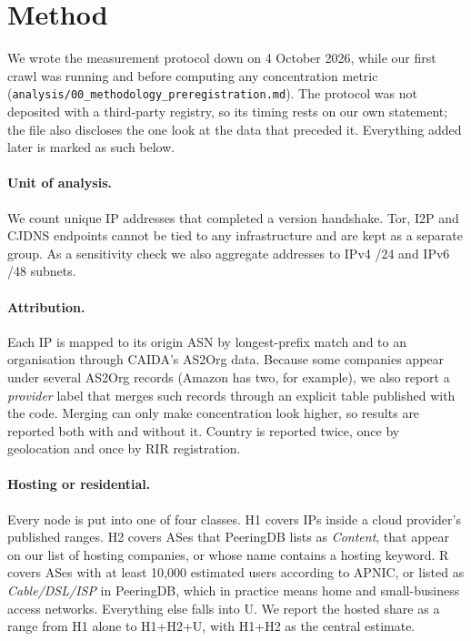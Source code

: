 \documentclass[10pt,a4paper]{article}
\begin{document}
\section{Method}\label{sec:method}

We wrote the measurement protocol down on 4 October 2026, while our first crawl was running and before computing any concentration metric (\texttt{analysis/00\_\allowbreak{}methodology\_\allowbreak{}preregistration.md}). The protocol was not deposited with a third-party registry, so its timing rests on our own statement; the file also discloses the one look at the data that preceded it. Everything added later is marked as such below.

\paragraph{Unit of analysis.} We count unique IP addresses that completed a version handshake. Tor, I2P and CJDNS endpoints cannot be tied to any infrastructure and are kept as a separate group. As a sensitivity check we also aggregate addresses to IPv4 /24 and IPv6 /48 subnets.

\paragraph{Attribution.} Each IP is mapped to its origin ASN by longest-prefix match and to an organisation through CAIDA's AS2Org data. Because some companies appear under several AS2Org records (Amazon has two, for example), we also report a \emph{provider} label that merges such records through an explicit table published with the code. Merging can only make concentration look higher, so results are reported both with and without it. Country is reported twice, once by geolocation and once by RIR registration.

\paragraph{Hosting or residential.} Every node is put into one of four classes. H1 covers IPs inside a cloud provider's published ranges. H2 covers ASes that PeeringDB lists as \emph{Content}, that appear on our list of hosting companies, or whose name contains a hosting keyword. R covers ASes with at least 10{,}000 estimated users according to APNIC, or listed as \emph{Cable/DSL/ISP} in PeeringDB, which in practice means home and small-business access networks. Everything else falls into U. We report the hosted share as a range from H1 alone to H1+H2+U, with H1+H2 as the central estimate.
\end{document}
